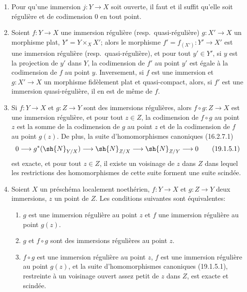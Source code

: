 \begin{proposition}[19.1.5]
\label{IV.19.1.5}
\begin{enumerate}
  \item[\textup{(i)}] Pour qu'une immersion $j:Y\to X$ soit ouverte, il faut et il suffit qu'elle soit régulière et de codimension $0$ en tout point.
  \item[\textup{(ii)}] Soient $f:Y\to X$ une immersion régulière \textup{(resp.}\ quasi-régulière\textup{)} $g:X'\to X$ un morphisme plat, $Y'=Y\times_X X'$; alors le morphisme $f'=f_{(X')}:Y'\to X'$ est une immersion régulière \textup{(resp.}\ quasi-régulière\textup{)}, et pour tout $y'\in Y'$, si $y$ est la projection de $y'$ dans $Y$, la codimension de $f'$ au point $y'$ est égale à la codimension de $f$ au point $y$. Inversement, si $f$ est une immersion et $g:X'\to X$ un morphisme fidèlement plat et quasi-compact, alors, si $f'$ est une immersion quasi-régulière, il en est de même de $f$.
  \item[\textup{(iii)}] Si $f:Y\to X$ et $g:Z\to Y$ sont des immersions régulières, alors $f\circ g:Z\to X$ est une immersion régulière, et pour tout $z\in Z$, la codimension de $f\circ g$ au point $z$ est la somme de la codimension de $g$ au point $z$ et de la codimension de $f$ au point $g(z)$. De plus, la suite d'homomorphismes canoniques \textup{(16.2.7.1)}
\begin{equation}
  0\longrightarrow g^*(\sh{N}_{Y/X})\longrightarrow\sh{N}_{Z/X}\longrightarrow\sh{N}_{Z/Y}\longrightarrow0
  \tag{19.1.5.1}\label{IV.19.1.5.1}
\end{equation}
est exacte, et pour tout $z\in Z$, il existe un voisinage de $z$ dans $Z$ dans lequel les restrictions des homomorphismes de cette suite forment une suite scindée.
  \item[\textup{(iv)}] Soient $X$ un préschéma localement noethérien, $f:Y\to X$ et $g:Z\to Y$ deux immersions, $z$ un point de $Z$. Les conditions suivantes sont équivalentes:
  \begin{enumerate}
    \item[\textup{a)}] $g$ est une immersion régulière au point $z$ et $f$ une immersion régulière au point $g(z)$.
    \item[\textup{b)}] $g$ et $f\circ g$ sont des immersions régulières au point $z$.
    \item[\textup{c)}] $f\circ g$ est une immersion régulière au point $z$, $f$ est une immersion régulière au point $g(z)$, et la suite d'homomorphismes canoniques \textup{(19.1.5.1)}, restreinte à un voisinage ouvert assez petit de $z$ dans $Z$, est exacte et scindée.

\end{enumerate}
\end{enumerate}
\end{proposition}
